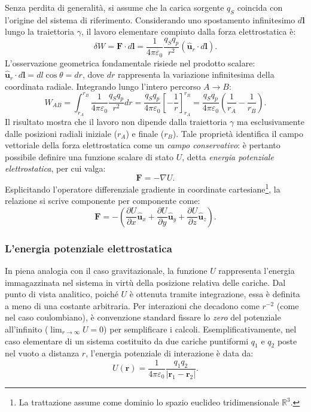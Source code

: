 \documentclass[a4paper,11pt]{report}
\begin{document}
\noindent
Senza perdita di generalità, si assume che la carica sorgente $q_S$ coincida con l'origine del sistema di riferimento.
Considerando uno spostamento infinitesimo $d\bm{l}$ lungo la traiettoria $\gamma$, il lavoro elementare compiuto dalla forza elettrostatica è:
\begin{equation}
    \delta W = \bm{F} \cdot d\bm{l} = \frac{1}{4 \pi \varepsilon_0} \frac{q_S q_p}{r^2} (\hat{\bm{u}}_r \cdot d\bm{l}).
\end{equation}
L'osservazione geometrica fondamentale risiede nel prodotto scalare: $\hat{\bm{u}}_r \cdot d\bm{l} = dl \cos\theta = dr$, dove $dr$ rappresenta la variazione infinitesima della coordinata radiale.
Integrando lungo l'intero percorso $A \to B$:
\begin{equation}
    W_{AB} = \int_{r_A}^{r_B} \frac{1}{4 \pi \varepsilon_0} \frac{q_S q_p}{r^2} dr = \frac{q_S q_p}{4 \pi \varepsilon_0} \left[ -\frac{1}{r} \right]_{r_A}^{r_B} = \frac{q_S q_p}{4 \pi \varepsilon_0} \left(\frac{1}{r_A}-\frac{1}{r_B}\right).
    \label{eq:lavoro_integrato}
\end{equation}
Il risultato mostra che il lavoro non dipende dalla traiettoria $\gamma$ ma esclusivamente dalle posizioni radiali iniziale ($r_A$) e finale ($r_B$).
Tale proprietà identifica il campo vettoriale della forza elettrostatica come un \textit{campo conservativo}: è pertanto possibile definire una funzione scalare di stato $U$, detta \textit{energia potenziale elettrostatica}, per cui valga:
\begin{equation}
\boxed{\bm{F} = -\nabla U}.
\label{eq:conservatività}
\end{equation}
Esplicitando l'operatore differenziale gradiente in coordinate cartesiane\footnote{La trattazione assume come dominio lo spazio euclideo tridimensionale $\mathbb{R}^3$.}, la relazione si scrive componente per componente come:
\begin{equation}
\bm{F} = -\left( \frac{\partial U}{\partial x}\hat{\bm{u}}_x + \frac{\partial U}{\partial y}\hat{\bm{u}}_y + \frac{\partial U}{\partial z}\hat{\bm{u}}_z \right).
\end{equation}

\subsubsection{L'energia potenziale elettrostatica}
In piena analogia con il caso gravitazionale, la funzione $U$ rappresenta l'energia immagazzinata nel sistema in virtù della posizione relativa delle cariche. 
Dal punto di vista analitico, poiché $U$ è ottenuta tramite integrazione, essa è definita a meno di una costante arbitraria. Per interazioni che decadono come $r^{-2}$ (come nel caso coulombiano), è convenzione standard fissare lo \emph{zero} del potenziale all'infinito ($\lim_{r \to \infty} U = 0$) per semplificare i calcoli. Esemplificativamente, nel caso elementare di un sistema costituito da due cariche puntiformi $q_1$ e $q_2$ poste nel vuoto a distanza $r$, l'energia potenziale di interazione è data da:
\begin{equation}
U(\bm{r}) = \frac{1}{4 \pi \varepsilon_0}\frac{q_1q_2}{|\bm{r}_1-\bm{r}_2|}.
\end{equation}
\end{document}
